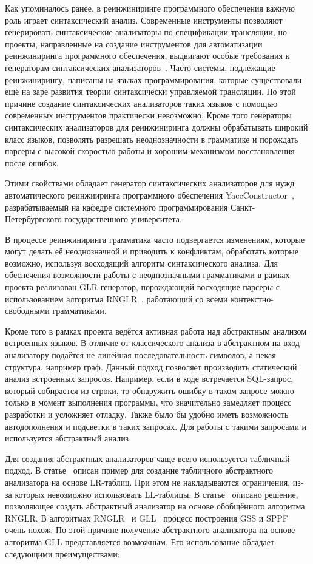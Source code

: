 Как упоминалось ранее, в реинжиниринге программного обеспечения важную роль играет синтаксический анализ. Современные инструменты позволяют генерировать синтаксические анализаторы по спецификации трансляции, но проекты, направленные на создание инструментов для автоматизации реинжиниринга программного обеспечения, выдвигают особые требования к генераторам синтаксических анализаторов~\cite{kirilenko}. Часто системы, подлежащие реинжинирингу, написаны на языках программирования, которые существовали ещё на заре развития теории синтаксически управляемой трансляции. По этой причине создание синтаксических анализаторов таких языков с помощью современных инструментов практически невозможно. Кроме того генераторы синтаксических анализаторов для реинжиниринга должны обрабатывать широкий класс языков, позволять разрешать неоднозначности в грамматике и порождать парсеры с высокой скоростью работы и хорошим механизмом восстановления после ошибок.

Этими свойствами обладает генератор синтаксических анализаторов для нужд автоматического реинжииринга программного обеспечения YaccConstructor~\cite{yc}, разрабатываемый на кафедре системного программирования Санкт-Петербургского государственного университета.

В процессе реинжиниринга грамматика часто подвергается изменениям, которые могут делать её неоднозначной и приводить к конфликтам, обработать которые возможно, используя восходящий алгоритм синтаксического анализа. Для обеспечения возможности работы с неоднозначными грамматиками в рамках проекта реализован GLR-генератор, порождающий восходящие парсеры с использованием алгоритма RNGLR~\cite{gll}, работающий со всеми контекстно-свободными грамматиками.

Кроме того в рамках проекта ведётся активная работа над абстрактным анализом встроенных языков. В отличие от классического анализа в абстрактном на вход анализатору подаётся не линейная последовательность символов, а некая структура, например граф. Данный подход позволяет производить статический анализ встроенных запросов. Например, если в коде встречается SQL-запрос, который собирается из строки, то обнаружить ошибку в таком запросе можно только в момент выполнения программы, что значительно замедляет процесс разработки и усложняет отладку. Также было бы удобно иметь возможность автодополнения и подсветки в таких запросах. Для работы с такими запросами и используется абстрактный анализ. 


Для создания абстрактных анализаторов чаще всего используется табличный подход. В статье~\cite{abstr} описан пример для создание табличного абстрактного анализатора на основе LR-таблиц. При этом не накладываются ограничения, из-за которых невозможно использовать LL-таблицы. В статье~\cite{abstr2} описано решение, позволяющее создать абстрактный анализатор на основе обобщённого алгоритма RNGLR. В алгоритмах RNGLR~\cite{rnglr} и GLL~\cite{abstr2} процесс построения GSS и SPPF очень похож. По этой причине получение абстрактного анализатора на основе алгоритма GLL  представляется возможным. Его использование обладает следующими преимуществами:


